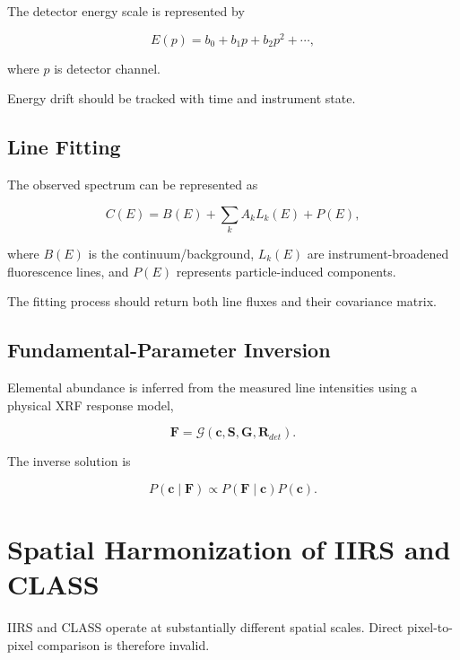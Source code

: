 \documentclass[11pt,a4paper]{article}
\begin{document}
The detector energy scale is represented by

\begin{equation}
E(p)
=
b_0+b_1p+b_2p^2+\cdots,
\end{equation}

where $p$ is detector channel.

Energy drift should be tracked with time and instrument state.

\subsection{Line Fitting}

The observed spectrum can be represented as

\begin{equation}
C(E)
=
B(E)
+
\sum_k
A_k L_k(E)
+
P(E),
\end{equation}

where $B(E)$ is the continuum/background, $L_k(E)$ are instrument-broadened fluorescence lines, and $P(E)$ represents particle-induced components.

The fitting process should return both line fluxes and their covariance matrix.

\subsection{Fundamental-Parameter Inversion}

Elemental abundance is inferred from the measured line intensities using a physical XRF response model,

\begin{equation}
\mathbf{F}
=
\mathcal{G}
\left(
\mathbf{c},
\mathbf{S},
\mathbf{G},
\mathbf{R}_{det}
\right).
\end{equation}

The inverse solution is

\begin{equation}
P(\mathbf{c}\mid\mathbf{F})
\propto
P(\mathbf{F}\mid\mathbf{c})
P(\mathbf{c}).
\end{equation}

\section{Spatial Harmonization of IIRS and CLASS}

IIRS and CLASS operate at substantially different spatial scales. Direct pixel-to-pixel comparison is therefore invalid.
\end{document}
